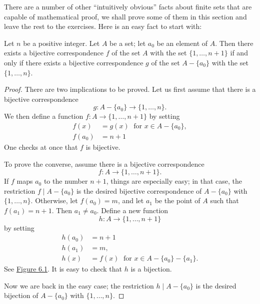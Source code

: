 There are a number of other ``intuitively obvious'' facts about finite sets that are capable 
of mathematical proof, we shall prove some of them in this section and leave the rest to 
the exercises. Here is an easy fact to start with:

\begin{lemma}
\label{lem:\thetheorem}
 Let \(n\) be a positive integer. Let \(A\) be a set; let \(a_{0}\) be an element of \(A\). Then there exists a bijective correspondence \(f\) of the set \(A\) with the set \(\{1,\ldots, n + 1\}\) if and only if there exists a bijective correspondence \(g\) of the set \(A - \{ a_{0}\}\) with the set \(\{1,\ldots, n\}\).
\end{lemma}

\begin{proof}
 There are two implications to be proved. Let us first assume that there is a bijective correspondence
 \[
 g : A - \{ a_{0}\} \rightarrow \{1,\ldots, n\}.
 \]
 We then define a function \(f : A \rightarrow \{1,\ldots, n + 1\}\) by setting
 \[
 \begin{aligned}
 f(x) &= g(x) \;\text{ for }x \in A - \{ a_{0}\} , \\
 f(a_{0}) &= n + 1
 \end{aligned}
 \]
 One checks at once that \(f\) is bijective.

 To prove the converse, assume there is a bijective correspondence
 \[
 f : A \rightarrow \{1,\ldots, n + 1\}.
 \]
 If \(f\) maps \(a_{0}\) to the number \(n + 1\), things are especially easy; in that case, the restriction \(f \mid A - \{ a_{0}\}\) is the desired bijective correspondence of \(A - \{ a_{0}\}\) with \(\{1,\ldots, n\}\). Otherwise, let \(f(a_{0}) = m\), and let \(a_{1}\) be the point of \(A\) such that \(f(a_{1}) = n + 1\). Then \(a_{1} \neq {a}_{0}\). Define a new function
 \[
 h : A \rightarrow \{1,\ldots, n + 1\}
 \]
 by setting
 \[
 \begin{aligned}
 h(a_{0}) &= n + 1 \\
 h(a_{1}) &= m, \\
 h(x) &= f(x) \;\text{ for }x \in A - \{ a_{0}\} - \{ a_{1}\} .
 \end{aligned}
 \]
 See \hyperref[fig:6.1]{Figure 6.1}. It is easy to check that \(h\) is a bijection.

 Now we are back in the easy case; the restriction \(h \mid A - \{ a_{0}\}\) is the desired bijection of \(A - \{ a_{0}\}\) with \(\{1,\ldots, n\}\).
\end{proof}

